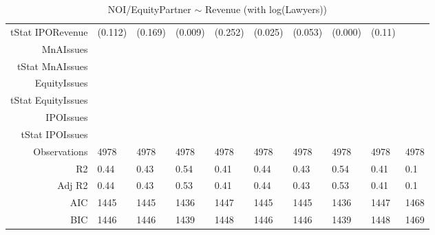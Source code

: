 \begin{table}[ht]
\begin{tabular}{rlllllllll}
  tStat IPORevenue & (0.112) & (0.169) & (0.009) & (0.252) & (0.025) & (0.053) & (0.000) & (0.11) &  \\ 
  MnAIssues &  &  &  &  &  &  &  &  &  \\ 
  tStat MnAIssues &  &  &  &  &  &  &  &  &  \\ 
  EquityIssues &  &  &  &  &  &  &  &  &  \\ 
  tStat EquityIssues &  &  &  &  &  &  &  &  &  \\ 
  IPOIssues &  &  &  &  &  &  &  &  &  \\ 
  tStat IPOIssues &  &  &  &  &  &  &  &  &  \\ 
  Observations & 4978 & 4978 & 4978 & 4978 & 4978 & 4978 & 4978 & 4978 & 4978 \\ 
  R2 & 0.44 & 0.43 & 0.54 & 0.41 & 0.44 & 0.43 & 0.54 & 0.41 & 0.1 \\ 
  Adj R2 & 0.44 & 0.43 & 0.53 & 0.41 & 0.44 & 0.43 & 0.53 & 0.41 & 0.1 \\ 
  AIC & 1445 & 1445 & 1436 & 1447 & 1445 & 1445 & 1436 & 1447 & 1468 \\ 
  BIC & 1446 & 1446 & 1439 & 1448 & 1446 & 1446 & 1439 & 1448 & 1469 \\ 
   \hline
\end{tabular}
\caption{NOI/EquityPartner $\sim$ Revenue (with log(Lawyers))} 
\end{table}
